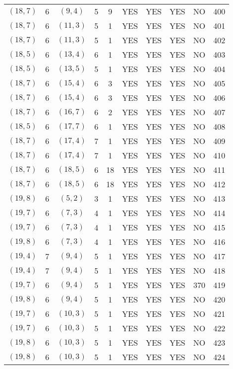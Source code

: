 \begin{longtable}{|c|c|c|c|c|c|c|c|c|c|}
$(18, 7)$ & 6 & $(9, 4)$ & 5 & 9 & YES & YES & YES & NO & 400\\
$(18, 7)$ & 6 & $(11, 3)$ & 5 & 1 & YES & YES & YES & NO & 401\\
$(18, 7)$ & 6 & $(11, 3)$ & 5 & 1 & YES & YES & YES & NO & 402\\
$(18, 5)$ & 6 & $(13, 4)$ & 6 & 1 & YES & YES & YES & NO & 403\\
$(18, 5)$ & 6 & $(13, 5)$ & 5 & 1 & YES & YES & YES & NO & 404\\
$(18, 7)$ & 6 & $(15, 4)$ & 6 & 3 & YES & YES & YES & NO & 405\\
$(18, 7)$ & 6 & $(15, 4)$ & 6 & 3 & YES & YES & YES & NO & 406\\
$(18, 7)$ & 6 & $(16, 7)$ & 6 & 2 & YES & YES & YES & NO & 407\\
$(18, 5)$ & 6 & $(17, 7)$ & 6 & 1 & YES & YES & YES & NO & 408\\
$(18, 7)$ & 6 & $(17, 4)$ & 7 & 1 & YES & YES & YES & NO & 409\\
$(18, 7)$ & 6 & $(17, 4)$ & 7 & 1 & YES & YES & YES & NO & 410\\
$(18, 7)$ & 6 & $(18, 5)$ & 6 & 18 & YES & YES & YES & NO & 411\\
$(18, 7)$ & 6 & $(18, 5)$ & 6 & 18 & YES & YES & YES & NO & 412\\
$(19, 8)$ & 6 & $(5, 2)$ & 3 & 1 & YES & YES & YES & NO & 413\\
$(19, 7)$ & 6 & $(7, 3)$ & 4 & 1 & YES & YES & YES & NO & 414\\
$(19, 7)$ & 6 & $(7, 3)$ & 4 & 1 & YES & YES & YES & NO & 415\\
$(19, 8)$ & 6 & $(7, 3)$ & 4 & 1 & YES & YES & YES & NO & 416\\
$(19, 4)$ & 7 & $(9, 4)$ & 5 & 1 & YES & YES & YES & NO & 417\\
$(19, 4)$ & 7 & $(9, 4)$ & 5 & 1 & YES & YES & YES & NO & 418\\
$(19, 7)$ & 6 & $(9, 4)$ & 5 & 1 & YES & YES & YES & 370 & 419\\
$(19, 8)$ & 6 & $(9, 4)$ & 5 & 1 & YES & YES & YES & NO & 420\\
$(19, 7)$ & 6 & $(10, 3)$ & 5 & 1 & YES & YES & YES & NO & 421\\
$(19, 7)$ & 6 & $(10, 3)$ & 5 & 1 & YES & YES & YES & NO & 422\\
$(19, 8)$ & 6 & $(10, 3)$ & 5 & 1 & YES & YES & YES & NO & 423\\
$(19, 8)$ & 6 & $(10, 3)$ & 5 & 1 & YES & YES & YES & NO & 424\\

\end{longtable}
